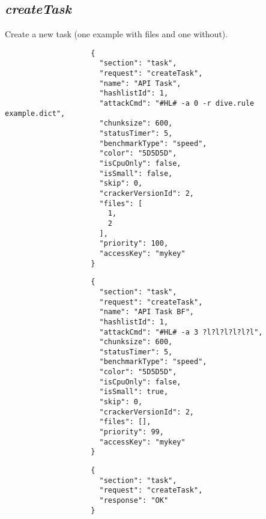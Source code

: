 \documentclass{article}
\begin{document}
			\subsection*{\textit{createTask}}
				Create a new task (one example with files and one without).
				{
					\color{blue}
					\begin{verbatim}
					{
					  "section": "task",
					  "request": "createTask",
					  "name": "API Task",
					  "hashlistId": 1,
					  "attackCmd": "#HL# -a 0 -r dive.rule example.dict",
					  "chunksize": 600,
					  "statusTimer": 5,
					  "benchmarkType": "speed",
					  "color": "5D5D5D",
					  "isCpuOnly": false,
					  "isSmall": false,
					  "skip": 0,
					  "crackerVersionId": 2,
					  "files": [
					    1,
					    2
					  ],
					  "priority": 100,
					  "accessKey": "mykey"
					}
					\end{verbatim}
				}
				{
					\color{blue}
					\begin{verbatim}
					{
					  "section": "task",
					  "request": "createTask",
					  "name": "API Task BF",
					  "hashlistId": 1,
					  "attackCmd": "#HL# -a 3 ?l?l?l?l?l?l",
					  "chunksize": 600,
					  "statusTimer": 5,
					  "benchmarkType": "speed",
					  "color": "5D5D5D",
					  "isCpuOnly": false,
					  "isSmall": true,
					  "skip": 0,
					  "crackerVersionId": 2,
					  "files": [],
					  "priority": 99,
					  "accessKey": "mykey"
					}
					\end{verbatim}
				}
				{
					\color{OliveGreen}
					\begin{verbatim}
					{
					  "section": "task",
					  "request": "createTask",
					  "response": "OK"
					}
					\end{verbatim}
				}
		
		
		
		
		
\end{document}
